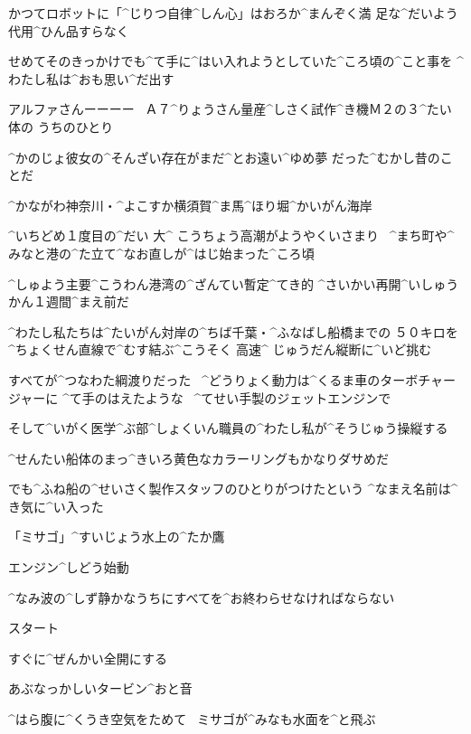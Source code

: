 \Sensei かつてロボットに「^{じりつ}{自律}^{しん}{心}」はおろか^{まんぞく}{満
  足}な^{だいよう}{代用}^{ひん}{品}すらなく

\Sensei せめてそのきっかけでも^{て}{手}に^{はい}{入}れようとしていた^{ころ}{頃}の^{こと}{事}を
^{わたし}{私}は^{おも}{思}い^{だ}{出}す

\Sensei アルファさんーーーー
\ Ａ７^{りょうさん}{量産}^{しさく}{試作}^{き}{機}Ｍ２の３^{たい}{体}の
うちのひとり

\Sensei ^{かのじょ}{彼女}の^{そんざい}{存在}がまだ^{とお}{遠}い^{ゆめ}{夢}
だった^{むかし}{昔}のことだ

\page[64]
\Sensei ^{かながわ}{神奈川}・^{よこすか}{横須賀}^{ま}{馬}^{ほり}{堀}^{かいがん}{海岸}

\Sensei ^{いちどめ}{１度目}の^{だい }{大}^{ こうちょう}{高潮}がようやくいさまり
\ ^{まち}{町}や^{みなと}{港}の^{た}{立}て^{なお}{直}しが^{はじ}{始}まった^{ころ}{頃}

\page[65]
\Sensei ^{しゅよう}{主要}^{こうわん}{港湾}の^{ざんてい}{暫定}^{てき}{的}
^{さいかい}{再開}^{いしゅうかん}{１週間}^{まえ}{前}だ

\Sensei ^{わたし}{私}たちは^{たいがん}{対岸}の^{ちば}{千葉}・^{ふなばし}{船橋}までの
５０キロを^{ちょくせん}{直線}で^{むす}{結}ぶ^{こうそく }{高速}^{ じゅうだん}{縦断}に^{いど}{挑}む

\page[66]
\Sensei すべてが^{つなわた}{綱渡}りだった
\ ^{どうりょく}{動力}は^{くるま}{車}のターボチャージャーに
^{て}{手}のはえたような
\ ^{てせい}{手製}のジェットエンジンで

\Sensei そして^{いがく}{医学}^{ぶ}{部}^{しょくいん}{職員}の^{わたし}{私}が^{そうじゅう}{操縦}する

\Sensei ^{せんたい}{船体}のまっ^{きいろ}{黄色}なカラーリングもかなりダサめだ

\Sensei でも^{ふね}{船}の^{せいさく}{製作}スタッフのひとりがつけたという
^{なまえ}{名前}は^{き}{気}に^{い}{入}った

\Sensei 「ミサゴ」^{すいじょう}{水上}の^{たか}{鷹}

\page[67]
\Sensei エンジン^{しどう}{始動}

\Sensei ^{なみ}{波}の^{しず}{静}かなうちにすべてを^{お}{終}わらせなければならない

\page[68]
\Sensei スタート

\page[69]
\Sensei すぐに^{ぜんかい}{全開}にする

\Sensei あぶなっかしいタービン^{おと}{音}

\Sensei ^{はら}{腹}に^{くうき}{空気}をためて
\ ミサゴが^{みなも}{水面}を^{と}{飛}ぶ


